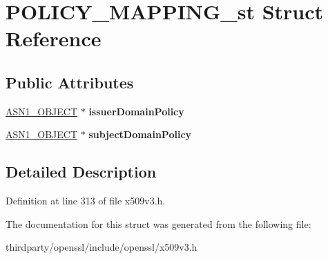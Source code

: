 \hypertarget{struct_p_o_l_i_c_y___m_a_p_p_i_n_g__st}{}\section{P\+O\+L\+I\+C\+Y\+\_\+\+M\+A\+P\+P\+I\+N\+G\+\_\+st Struct Reference}
\label{struct_p_o_l_i_c_y___m_a_p_p_i_n_g__st}
\subsection*{Public Attributes}
\begin{DoxyCompactItemize}
\item 
\mbox{\label{struct_p_o_l_i_c_y___m_a_p_p_i_n_g__st_a426cb055da517faf080f42de138bead3}} 
\hyperlink{structasn1__object__st}{A\+S\+N1\+\_\+\+O\+B\+J\+E\+CT} $\ast$ {\bfseries issuer\+Domain\+Policy}
\item 
\mbox{\label{struct_p_o_l_i_c_y___m_a_p_p_i_n_g__st_ad397a2367d90e97217ee96ff07ee5604}} 
\hyperlink{structasn1__object__st}{A\+S\+N1\+\_\+\+O\+B\+J\+E\+CT} $\ast$ {\bfseries subject\+Domain\+Policy}
\end{DoxyCompactItemize}


\subsection{Detailed Description}


Definition at line 313 of file x509v3.\+h.



The documentation for this struct was generated from the following file\+:\begin{DoxyCompactItemize}
\item 
thirdparty/openssl/include/openssl/x509v3.\+h\end{DoxyCompactItemize}
